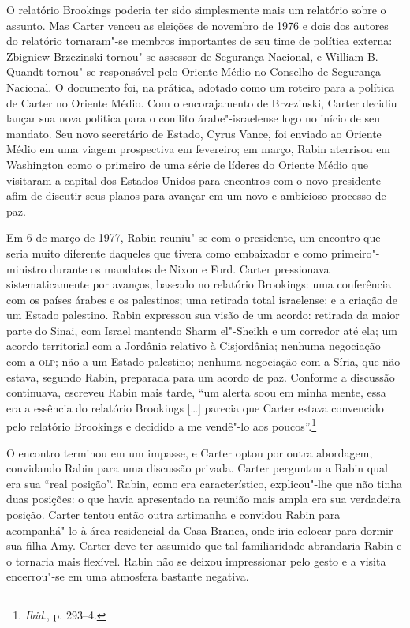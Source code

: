 O relatório Brookings poderia ter sido simplesmente mais um relatório
sobre o assunto. Mas Carter venceu as eleições de novembro de 1976 e
dois dos autores do relatório tornaram"-se membros importantes de seu
time de política externa: Zbigniew Brzezinski tornou"-se assessor de
Segurança Nacional, e William B. Quandt tornou"-se responsável pelo Oriente
Médio no Conselho de Segurança Nacional. O documento foi, na prática,
adotado como um roteiro para a política de Carter no Oriente Médio. Com
o encorajamento de Brzezinski, Carter decidiu lançar sua nova política
para o conflito árabe"-israelense logo no início de seu mandato. Seu novo
secretário de Estado, Cyrus Vance, foi enviado ao Oriente Médio em uma
viagem prospectiva em fevereiro; em março, Rabin aterrisou em Washington
como o primeiro de uma série de líderes do Oriente Médio que visitaram
a capital dos Estados Unidos para encontros com o novo presidente afim de discutir
seus planos para avançar em um novo e ambicioso processo de paz.

Em 6 de março de 1977, Rabin reuniu"-se com o presidente, um encontro
que seria muito diferente daqueles que tivera como embaixador e como
primeiro"-ministro durante os mandatos de Nixon e Ford. Carter
pressionava sistematicamente por avanços, baseado no relatório
Brookings: uma conferência com os países árabes e os palestinos; uma
retirada total israelense; e a criação de um Estado palestino. Rabin
expressou sua visão de um acordo: retirada da maior parte do Sinai, com
Israel mantendo Sharm el"-Sheikh e um corredor até ela; um acordo
territorial com a Jordânia relativo à Cisjordânia; nenhuma negociação
com a \textsc{olp}; não a um Estado palestino; nenhuma negociação com a Síria, que
não estava, segundo Rabin, preparada para um acordo de paz. Conforme a
discussão continuava, escreveu Rabin mais tarde, ``um alerta soou em
minha mente, essa era a essência do relatório Brookings {[}\ldots{}{]} parecia que
Carter estava convencido pelo relatório Brookings e decidido a me
vendê"-lo aos poucos''.\footnote{\emph{Ibid}., p. 293--4.}

O encontro terminou em um impasse, e Carter optou por outra abordagem,
convidando Rabin para uma discussão privada. Carter perguntou a Rabin
qual era sua ``real posição''. Rabin, como era característico,
explicou"-lhe que não tinha duas posições: o que havia apresentado na
reunião mais ampla era sua verdadeira posição. Carter tentou então outra
artimanha e convidou Rabin para acompanhá"-lo à área residencial da Casa
Branca, onde iria colocar para dormir sua filha Amy. Carter deve ter
assumido que tal familiaridade abrandaria Rabin e o tornaria mais
flexível. Rabin não se deixou impressionar pelo gesto e a visita
encerrou"-se em uma atmosfera bastante negativa.


